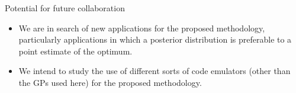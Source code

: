 \documentclass[final]{beamer}
\newlength{\onecolwid}
\begin{document}
\begin{frame}[t]
\begin{columns}[t]
\begin{column}{\onecolwid}



%
%




\begin{alertblock}{Potential for future collaboration}


\begin{itemize}
\item We are in search of new applications for the proposed methodology, particularly applications in which a posterior distribution is preferable to a point estimate of the optimum.

\item We intend to study the use of different sorts of code emulators (other than the GPs used here) for the proposed methodology.


\end{itemize}
\end{alertblock}
\end{column}
\end{columns}
\end{frame}
\end{document}

